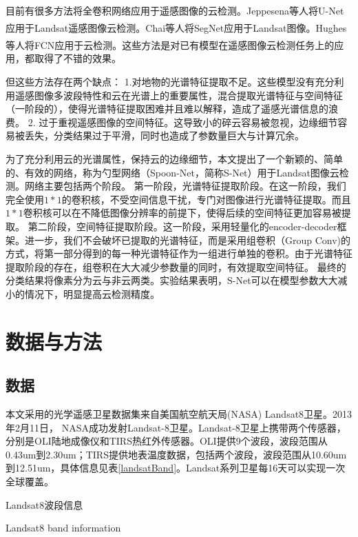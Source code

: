 \documentclass[10pt]{ctexart}
\newcommand{\upcite}[1]{\textsuperscript{\textsuperscript{\cite{#1}}}}
\begin{document}
\begin{multicols}{2}
目前有很多方法将全卷积网络应用于遥感图像的云检测。Jeppesena等人\upcite{jeppesen2019cloud}将U-Net应用于Landsat遥感图像云检测。Chai等人\upcite{chai2019cloud}将SegNet应用于Landsat图像。Hughes等人\upcite{hughes2019high}将FCN应用于云检测。这些方法是对已有模型在遥感图像云检测任务上的应用，都取得了不错的效果。

但这些方法存在两个缺点：
1.对地物的光谱特征提取不足。这些模型没有充分利用遥感图像多波段特性和云在光谱上的重要属性，混合提取光谱特征与空间特征（一阶段的），使得光谱特征提取困难并且难以解释，造成了遥感光谱信息的浪费。
2. 过于重视遥感图像的空间特征。这导致小的碎云容易被忽视，边缘细节容易被丢失，分类结果过于平滑，同时也造成了参数量巨大与计算冗余。

为了充分利用云的光谱属性，保持云的边缘细节，本文提出了一个新颖的、简单的、有效的网络，称为勺型网络（Spoon-Net，简称S-Net）用于Landsat图像云检测。网络主要包括两个阶段。
第一阶段，光谱特征提取阶段。在这一阶段，我们完全使用$1*1$的卷积核，不受空间信息干扰，专门对图像进行光谱特征提取。而且$1*1$卷积核可以在不降低图像分辨率的前提下，使得后续的空间特征更加容易被提取。
第二阶段，空间特征提取阶段。这一阶段，采用轻量化的encoder-decoder框架。进一步，我们不会破坏已提取的光谱特征，而是采用组卷积（Group Conv)的方式，将第一部分得到的每一种光谱特征作为一组进行单独的卷积。由于光谱特征提取阶段的存在，组卷积在大大减少参数量的同时，有效提取空间特征。
最终的分类结果将像素分为云与非云两类。实验结果表明，S-Net可以在模型参数大大减小的情况下，明显提高云检测精度。

\section[]{数据与方法}
\subsection{数据}
本文采用的光学遥感卫星数据集来自美国航空航天局(NASA) Landsat8卫星。2013年2月11日， NASA成功发射Landsat-8卫星。Landsat-8卫星上携带两个传感器，分别是OLI陆地成像仪和TIRS热红外传感器。OLI提供9个波段，波段范围从0.43um到2.30um；TIRS提供地表温度数据，包括两个波段，波段范围从10.60um到12.51um，具体信息见表\ref{landsatBand}。Landsat系列卫星每16天可以实现一次全球覆盖。

\begin{table}[H]
    \caption{Landsat8波段信息}
    \addtocounter{table}{-1}
    \vspace{-5pt}
    \renewcommand{\tablename}{Tab}
    \caption{Landsat8 band information}
    \renewcommand{\tablename}{表}
    \vspace{5pt}


\end{table}
\end{multicols}
\end{document}
